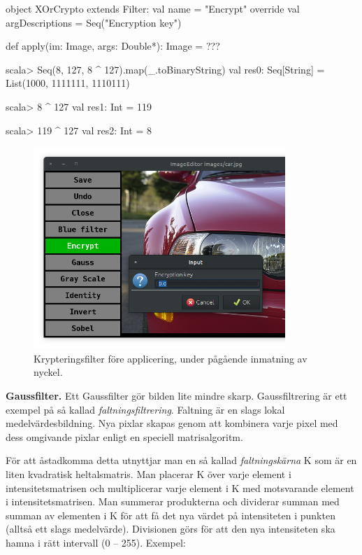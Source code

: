 \begin{CodeSmall}
  object XOrCrypto extends Filter:
    val name = "Encrypt"
    override val argDescriptions = Seq("Encryption key")

    def apply(im: Image, args: Double*): Image = ???
\end{CodeSmall}

\begin{REPLnonum}
scala> Seq(8, 127, 8 ^ 127).map(_.toBinaryString)
val res0: Seq[String] = List(1000, 1111111, 1110111)

scala> 8 ^ 127
val res1: Int = 119

scala> 119 ^ 127
val res2: Int = 8
\end{REPLnonum}

\begin{figure}
\centering
\includegraphics[width=0.85\textwidth]{../img/w12-assignment-photo/photo-xor.png}
\caption{Krypteringsfilter före applicering, under pågående inmatning av nyckel. }
\label{photo:fig:photo-xor}
\end{figure}
  

\Task \textbf{Gaussfilter.} Ett Gaussfilter gör bilden lite mindre skarp. Gaussfiltrering är ett exempel på så kallad \emph{faltningsfiltrering}. Faltning  är en slags lokal medelvärdesbildning. Nya pixlar skapas genom att kombinera varje pixel med dess omgivande pixlar enligt en speciell matrisalgoritm.

För att åstadkomma detta utnyttjar man en så kallad \emph{faltningskärna} K som är en liten kvadratisk heltalsmatris. Man placerar K över varje element i intensitetsmatrisen och multiplicerar varje element i K med motsvarande element i intensitetsmatrisen. Man summerar produkterna och dividerar summan med summan av elementen i K för att få det nya värdet på intensiteten i punkten (alltså ett slags medelvärde). Divisionen görs för att den nya intensiteten ska hamna i rätt intervall (0 -- 255).
Exempel:

